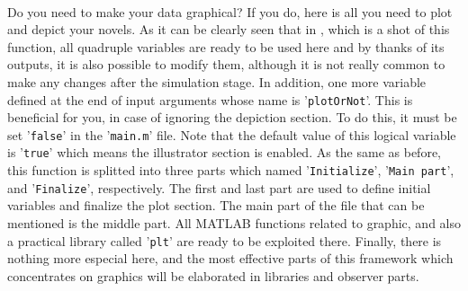 {{{			\paragraph{} {
				Do you need to make your data graphical? If you do, here is all you need to plot and depict your novels.
				As it can be clearly seen that in , which is a shot of this function, all quadruple variables are ready to be used here and by thanks of its outputs, it is also possible to modify them, although it is not really common to make any changes after the simulation stage.
				In addition, one more variable defined at the end of input arguments whose name is '\texttt{plotOrNot}'.
				This is beneficial for you, in case of ignoring the depiction section.
				To do this, it must be set '\texttt{false}' in the '\texttt{main.m}' file.
				Note that the default value of this logical variable is '\texttt{true}' which means the illustrator section is enabled.
				As the same as before, this function is splitted into three parts which named '\texttt{Initialize}', '\texttt{Main part}', and '\texttt{Finalize}', respectively.
				The first and last part are used to define initial variables and finalize the plot section.
				The main part of the file that can be mentioned is the middle part.
				All MATLAB functions related to graphic, and also a practical library called '\texttt{plt}' are ready to be exploited there.
				Finally, there is nothing more especial here, and the most effective parts of this framework which concentrates on graphics will be elaborated in libraries and observer parts.
			}
			\begin{figure}[tbp]
			\end{figure}
		}

}}

